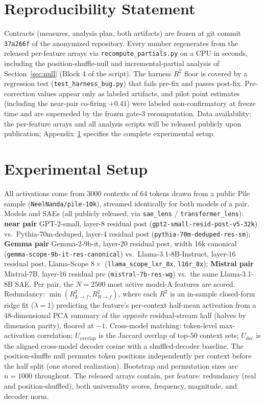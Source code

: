 \documentclass[11pt]{article}
\begin{document}
\section*{Reproducibility Statement}
Contracts (measures, analysis plan, both artifacts) are frozen at git commit \texttt{37a266f} of the
anonymized repository. Every number regenerates from the released per-feature arrays via
\texttt{recompute\_partials.py} on a CPU in seconds, including the position-shuffle-null and
incremental-partial analysis of Section~\ref{sec:null} (Block 4 of the script). The harness $R^2$ floor is covered by a regression
test (\texttt{test\_harness\_bug.py}) that fails pre-fix and passes post-fix. Pre-correction values
appear only as labeled artifacts, and pilot point estimates (including the near-pair co-firing $+0.41$)
were labeled non-confirmatory at freeze time and are superseded by the frozen gate-3 recomputation. Data
availability: the per-feature arrays and all analysis scripts will be released publicly upon publication;
Appendix~\ref{app:setup} specifies the complete experimental setup.



\appendix
\section{Experimental Setup}
\label{app:setup}
All activations come from $3000$ contexts of $64$ tokens drawn from a public Pile sample
(\texttt{NeelNanda/pile-10k}), streamed identically for both models of a pair. Models and SAEs (all
publicly released, via \texttt{sae\_lens} / \texttt{transformer\_lens}): \textbf{near pair} GPT-2-small,
layer-8 residual post (\texttt{gpt2-small-resid-post-v5-32k}) vs.\ Pythia-70m-deduped, layer-4 residual
post (\texttt{pythia-70m-deduped-res-sm}); \textbf{Gemma pair} Gemma-2-9b-it, layer-20 residual post,
width 16k canonical (\texttt{gemma-scope-9b-it-res-canonical}) vs.\ Llama-3.1-8B-Instruct, layer-16
residual post, Llama-Scope $8\times$ (\texttt{llama\_scope\_lxr\_8x}, \texttt{l16r\_8x}); \textbf{Mistral
pair} Mistral-7B, layer-16 residual pre (\texttt{mistral-7b-res-wg}) vs.\ the same Llama-3.1-8B SAE.
Per pair, the $N{=}2500$ most active model-A features are scored. Redundancy:
$\min(R^2_{L\to f}, R^2_{R\to f})$, where each $R^2$ is an in-sample closed-form ridge fit
($\lambda{=}1$) predicting the feature's per-context half-mean activation from a $48$-dimensional PCA
summary of the \emph{opposite} residual-stream half (halves by dimension parity), floored at $-1$.
Cross-model matching: token-level max-activation correlation; $U_{\text{overlap}}$ is the Jaccard
overlap of top-$50$ context sets; $U_{\text{dec}}$ is the aligned cross-model decoder cosine with a
shuffled-decoder baseline. The position-shuffle null permutes token positions independently per context
before the half split (one stored realization). Bootstrap and permutation sizes are $n{=}1000$
throughout. The released arrays contain, per feature: redundancy (real and position-shuffled), both
universality scores, frequency, magnitude, and decoder norm.
\end{document}
